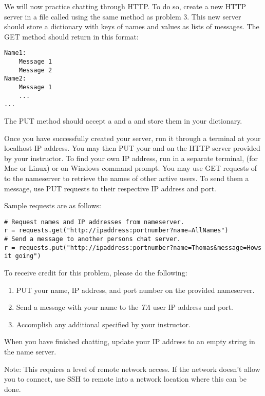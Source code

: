 \begin{problem}
We will now practice chatting through HTTP. 
To do so, create a new HTTP server in a file called  using the same method as problem 3.
This new server should store a dictionary with keys of names and values as lists of messages.
The GET method should return in this format:
\begin{lstlisting}
Name1:
	Message 1
	Message 2
Name2:
	Message 1
	...
...
\end{lstlisting} 
The PUT method should accept a  and a  and store them in your dictionary.

Once you have successfully created your server, run it through a terminal at your localhost IP address. 
You may then PUT your  and  on the HTTP server provided by your instructor. 
To find your own IP address, run in a separate terminal,  (for Mac or Linux) or  on Windows command prompt. 
You may use GET requests of  to the nameserver to retrieve the names of other active users. 
To send them a message, use PUT requests to their respective IP address and port.

Sample requests are as follows:

\begin{lstlisting}
# Request names and IP addresses from nameserver.
r = requests.get("http://ipaddress:portnumber?name=AllNames")
# Send a message to another persons chat server.
r = requests.put("http://ipaddress:portnumber?name=Thomas&message=Hows it going")
\end{lstlisting}

To receive credit for this problem, please do the following:
\begin{enumerate}
\item PUT your name, IP address, and port number on the provided nameserver.
\item Send a message with your name to the \textit{TA} user IP address and port.
\item Accomplish any additional specified by your instructor.
\end{enumerate}

When you have finished chatting, update your IP address to an empty string in the name server.

Note: This requires a level of remote network access. If the network doesn't allow you to connect, use SSH to remote into a network location where this can be done.
\end{problem}
